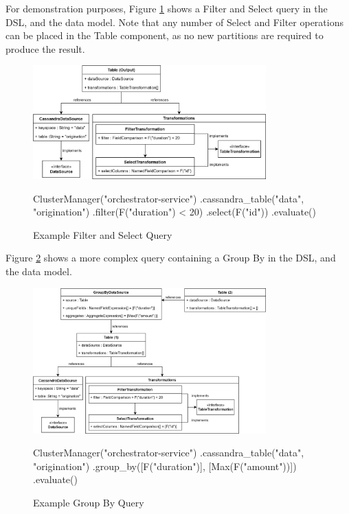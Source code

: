 For demonstration purposes, Figure \ref{fig:filter-select-query} shows a Filter and Select query in the DSL, and the data model. Note that any number of Select and Filter operations can be placed in the Table component, as no new partitions are required to produce the result.

\begin{figure}[h]
	\centering
	\includegraphics[width=0.8\textwidth]{chapters/diagrams/implementation/filter-select-query}
	\begin{python}
ClusterManager("orchestrator-service")
.cassandra_table("data", "origination")
.filter(F("duration") < 20)
.select(F("id"))
.evaluate()
	\end{python}
	\caption{Example Filter and Select Query}
	\label{fig:filter-select-query}
\end{figure}


Figure \ref{fig:group-by-query} shows a more complex query containing a Group By in the DSL, and the data model.

\begin{figure}[h]
	\centering
	\includegraphics[width=0.8\textwidth]{chapters/diagrams/implementation/group-by-query}
	\linebreak
	\begin{python}
ClusterManager("orchestrator-service")
.cassandra_table("data", "origination")
.group_by([F("duration")], [Max(F("amount"))])
.evaluate()
	\end{python}
	\caption{Example Group By Query}
	\label{fig:group-by-query}
\end{figure}

